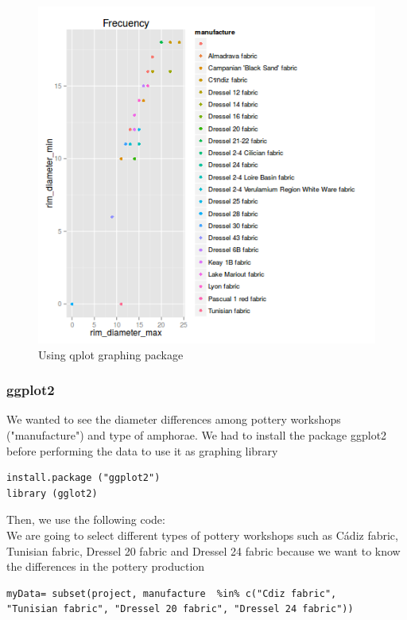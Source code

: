\documentclass[10pt,a4paper]{article}
\begin{document}
\begin{figure}[htp]
\centering
\includegraphics[scale=0.40]{qplotminmax.png}
\caption{Using qplot graphing package}
\label{qplot}
\end{figure}


\subsubsection{ggplot2}

We wanted to see the diameter differences among pottery workshops ("manufacture") and type of amphorae. We had to install the package ggplot2 before performing the data to use it as graphing library 

\begin{verbatim}
install.package ("ggplot2")
library (gglot2)
\end{verbatim}

Then, we use the following code: \\

We are going to select different types of pottery workshops such as C\'adiz fabric, Tunisian fabric, Dressel 20 fabric and Dressel 24 fabric because we want to know the differences in the pottery production

\begin{verbatim}
myData= subset(project, manufacture  %in% c("Cdiz fabric", 
"Tunisian fabric", "Dressel 20 fabric", "Dressel 24 fabric"))

\end{verbatim}
\end{document}
